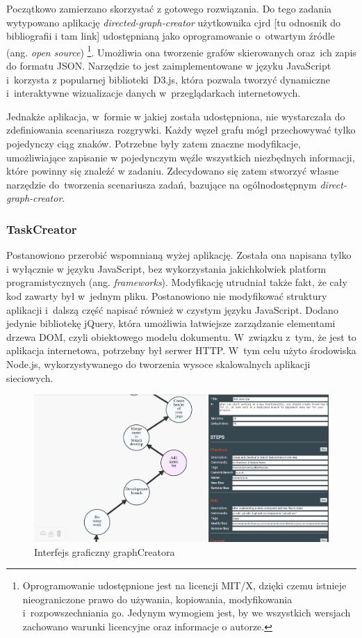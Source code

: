 \documentclass[11pt,a4paper,polish,thesis]{dcsbook}
\begin{document}
	Początkowo zamierzano skorzystać z gotowego rozwiązania. Do tego zadania wytypowano aplikację \textit{directed-graph-creator} użytkownika cjrd [tu odnosnik do bibliografii i tam link] udostępnianą jako oprogramowanie o~otwartym źródle (ang. \textit{open source}) \footnote{Oprogramowanie udostępnione jest na licencji MIT/X, dzięki czemu istnieje nieograniczone prawo do używania, kopiowania, modyfikowania i~rozpowszechniania go. Jedynym wymogiem jest, by we wszystkich wersjach zachowano warunki licencyjne oraz informacje o autorze.}. Umożliwia ona tworzenie grafów skierowanych oraz~ich zapis do formatu JSON. Narzędzie to jest zaimplementowane w języku JavaScript i~korzysta z popularnej biblioteki~D3.js, która pozwala tworzyć dynamiczne i~interaktywne wizualizacje danych w~przeglądarkach internetowych.
	
	Jednakże aplikacja, w~formie w jakiej została udostępniona, nie wystarczała do zdefiniowania scenariusza rozgrywki. Każdy węzeł grafu mógł przechowywać tylko pojedynczy ciąg znaków. Potrzebne były zatem znaczne modyfikacje, umożliwiające zapisanie w pojedynczym węźle wszystkich niezbędnych informacji, które powinny się znaleźć w zadaniu. Zdecydowano się zatem stworzyć własne narzędzie do~tworzenia scenariusza zadań, bazujące na ogólnodostępnym \textit{direct-graph-creator}.
	
	\subsubsection{TaskCreator}
	
	Postanowiono przerobić wspomnianą wyżej aplikację. Została ona napisana tylko i wyłącznie w języku JavaScript, bez wykorzystania jakichkolwiek platform programistycznych (ang. \textit{frameworks}). Modyfikację utrudniał także fakt, że cały kod zawarty był w~jednym pliku. Postanowiono nie modyfikować struktury aplikacji i~dalszą część napisać również w czystym języku JavaScript. Dodano jedynie bibliotekę jQuery, która umożliwia łatwiejsze zarządzanie elementami drzewa DOM, czyli obiektowego modelu dokumentu. W~związku z~tym, że jest to aplikacja internetowa, potrzebny był serwer HTTP. W~tym celu użyto środowiska Node.js, wykorzystywanego do tworzenia wysoce skalowalnych aplikacji sieciowych.
		
	\begin{figure}
		\centering
		\includegraphics[width=15cm]{graphCreator01}
		\caption{Interfejs graficzny graphCreatora}
		\label{fig:graphCreator}
	\end{figure}
	
\end{document}

